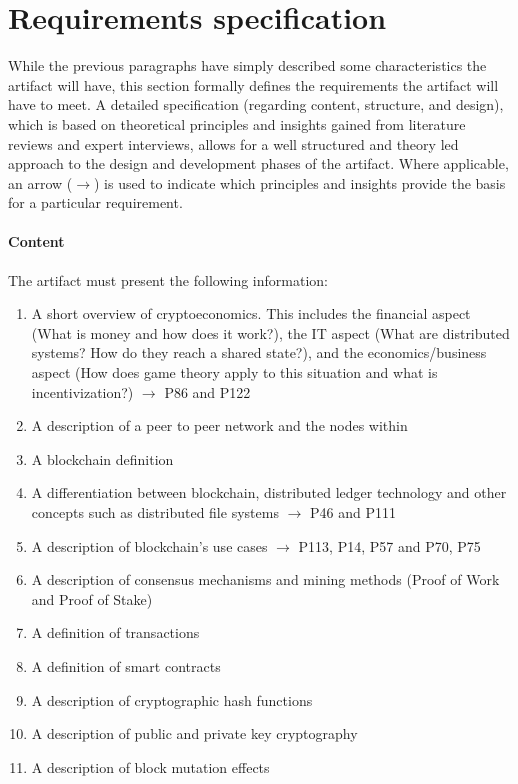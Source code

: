 \section{Requirements specification} \label{sec:ReqSpec}
While the previous paragraphs have simply described some characteristics the artifact will have, this section formally defines the requirements the artifact will have to meet. A detailed specification (regarding content, structure, and design), which is based on theoretical principles and insights gained from literature reviews and expert interviews, allows for a well structured and theory led approach to the design and development phases of the artifact. Where applicable, an arrow ($\rightarrow$) is used to indicate which principles and insights provide the basis for a particular requirement.

\paragraph{Content} The artifact must present the following information: 
\begin{enumerate}[nosep]
    \item A short overview of cryptoeconomics. This includes the financial aspect (What is money and how does it work?), the IT aspect (What are distributed systems? How do they reach a shared state?), and the economics/business aspect (How does game theory apply to this situation and what is incentivization?) $\rightarrow$ \cite{RalphBeckmann_Interview} P86 and P122
    \item A description of a peer to peer network and the nodes within
    \item A blockchain definition 
    \item A differentiation between blockchain, distributed ledger technology and other concepts such as distributed file systems $\rightarrow$ \cite{DanielKaltenbach_Interview} P46 and \cite{RalphBeckmann_Interview} P111
    \item A description of blockchain's use cases $\rightarrow$ \cite{RalphBeckmann_Interview} P113, \cite{DanielKaltenbach_Interview} P14, P57 and \cite{BjoernPaulewicz_Interview} P70, P75
    \item A description of consensus mechanisms and mining methods (Proof of Work and Proof of Stake)
    \item A definition of transactions
    \item A definition of smart contracts
    \item A description of cryptographic hash functions
    \item A description of public and private key cryptography
    \item A description of block mutation effects
\setcounter{foo}{\value{enumi}}
\end{enumerate}

